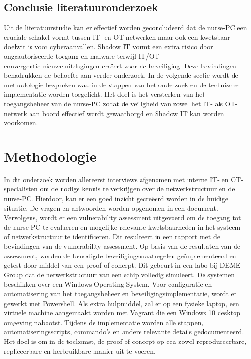 \subsection{Conclusie literatuuronderzoek}
Uit de literatuurstudie kan er effectief worden geconcludeerd dat de nurse-PC een cruciale schakel vormt tussen IT- en OT-netwerken maar ook een kwetsbaar doelwit is voor cyberaanvallen. 
Shadow IT vormt een extra risico door ongeautoriseerde toegang en malware terwijl IT/OT-\\convergentie nieuwe uitdagingen creëert voor de beveiliging. 
Deze bevindingen benadrukken de behoefte aan verder onderzoek. In de volgende sectie wordt de methodologie besproken waarin de stappen van het onderzoek 
en de technische implementatie worden toegelicht. Het doel is het versterken van het toegangsbeheer van de nurse-PC zodat de veiligheid van zowel het IT- als OT-netwerk aan boord 
effectief wordt gewaarborgd en Shadow IT kan worden voorkomen.



\section{Methodologie}%
\label{sec:methodologie}
In dit onderzoek worden allereerst interviews afgenomen met interne IT- en OT-specialisten om de nodige kennis te verkrijgen over de netwerkstructuur en de nurse-PC.
Hierdoor, kan er een goed inzicht gecreëerd worden in de huidige situatie. De vragen en antwoorden worden opgenomen in een document.
Vervolgens, wordt er een vulnerability assessment uitgevoerd om de toegang tot de nurse-PC te evalueren en mogelijke relevante kwetsbaarheden in het systeem of netwerkstructuur te identificeren. 
Dit resulteert in een rapport met de bevindingen van de vulnerability assessment.
Op basis van de resultaten van de assessment, worden de benodigde beveiligingsmaatregelen geïmplementeerd en getest door middel van een proof-of-concept. Dit gebeurt in een labo bij DEME-Group dat de netwerkstructuur van een schip volledig simuleert.  
De systemen beschikken over een Windows Operating System. Voor configuratie en automatisering van het toegangsbeheer en beveiligingsimplementatie, wordt er gewerkt met Powershell. 
Als extra hulpmiddel, zal er op een fysieke laptop, een virtuele machine aangemaakt worden met Vagrant die een Windows 10 desktop omgeving nabootst.
Tijdens de implementatie worden alle stappen, automatiseringsscripts, commando's en andere relevante details gedocumenteerd. Het doel is om in de toekomst, de proof-of-concept op een zowel reproduceerbare, repliceerbare en herbruikbare manier uit te voeren.


